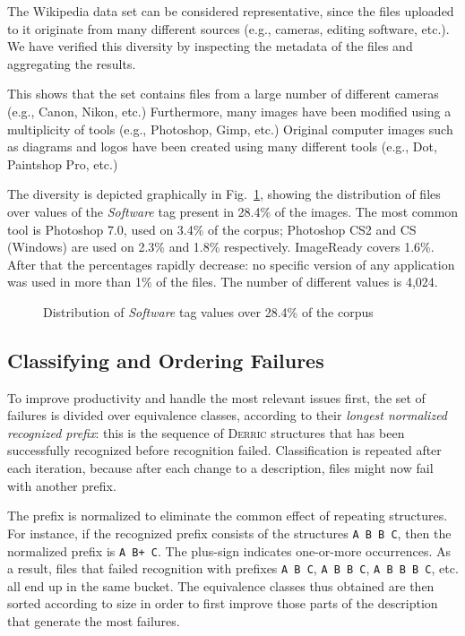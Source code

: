 \documentclass[a4paper]{llncs}
\def\derric{\textsc{Derric}\xspace}
\newcommand{\EXIF}{\textsmaller{EXIF}\xspace}
\begin{document}
The Wikipedia data set can be considered representative, since the files uploaded to it originate from many different sources (e.g., cameras, editing software, etc.).
We have verified this diversity by inspecting the metadata of the files and aggregating the results.

This shows that the set contains files from a large number of different cameras (e.g., Canon, Nikon, etc.)
Furthermore, many images have been modified using a multiplicity of tools (e.g., Photoshop, Gimp, etc.)
Original computer images such as diagrams and logos have been created using many different tools (e.g., Dot, Paintshop Pro, etc.)

The diversity is depicted graphically in Fig.~\ref{fig:software}, showing the distribution of files over values of the \EXIF \textit{Software} tag present in 28.4\% of the images.
The most common tool is Photoshop 7.0, used on 3.4\% of the corpus; Photoshop CS2 and CS (Windows) are used on 2.3\% and 1.8\% respectively.
ImageReady covers 1.6\%.
After that the percentages rapidly decrease:
no specific version of any application was used in more than 1\% of the files. 
The number of different values is 4,024.

\begin{figure}
\begin{center}
{\small

}
\caption{Distribution of \EXIF \textit{Software} tag values over 28.4\% of the corpus\label{fig:software}}
\end{center}
\end{figure}

\subsection{Classifying and Ordering Failures\label{sect:sorting}}

\noindent
To improve productivity and handle the most relevant issues first, the set of failures is divided over equivalence classes, according to their \textit{longest normalized recognized prefix}: this is the sequence of \derric structures that has been successfully recognized before recognition failed. 
Classification is repeated after each iteration, because after each change to a description, files might now fail with another prefix.

The prefix is normalized to eliminate the common effect of repeating structures. 
For instance, if the recognized prefix consists of the structures \texttt{A B B C}, then the normalized prefix is \texttt{A B+ C}. 
The plus-sign indicates one-or-more occurrences. 
As a result, files that failed recognition with prefixes \texttt{A B C}, \texttt{A B B C}, \texttt{A B B B C}, etc. all end up in the same bucket. 
The equivalence classes thus obtained are then sorted according to size in order to first improve those parts of the description that generate the most failures.
\end{document}
